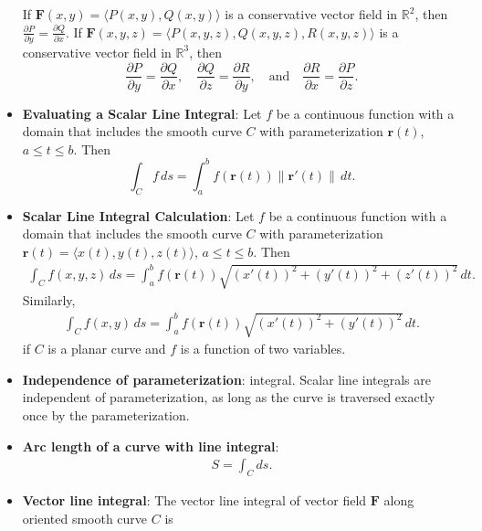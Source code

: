 \documentclass{report}
\begin{document}
\begin{itemize}
            \bigbreak \noindent 
            If $\mathbf{F}(x,y) = \langle P(x,y), Q(x,y) \rangle$ is a conservative vector field in $\mathbb{R}^2$, then $\frac{\partial P}{\partial y} = \frac{\partial Q}{\partial x}$.
            \bigbreak \noindent 
            If $\mathbf{F}(x,y,z) = \langle P(x,y,z), Q(x,y,z), R(x,y,z) \rangle$ is a conservative vector field in $\mathbb{R}^3$, then
            \[
                \frac{\partial P}{\partial y} = \frac{\partial Q}{\partial x}, \quad \frac{\partial Q}{\partial z} = \frac{\partial R}{\partial y}, \quad \text{and} \quad \frac{\partial R}{\partial x} = \frac{\partial P}{\partial z}.
            \]
        \item \textbf{Evaluating a Scalar Line Integral}:
            Let \(f\) be a continuous function with a domain that includes the smooth curve \(C\) with parameterization \(\mathbf{r}(t)\), \(a \leq t \leq b\). Then
            \[
                \int_C f\,ds = \int_a^b f(\mathbf{r}(t)) \|\mathbf{r}'(t)\|\,dt.
            \]
        \item \textbf{Scalar Line Integral Calculation}:
            Let $f$ be a continuous function with a domain that includes the smooth curve $C$ with parameterization $\mathbf{r}(t) = \langle x(t), y(t), z(t) \rangle$, $a \leq t \leq b$. Then
            \begin{align*}
                \int_{C} f(x,y,z)\,ds = \int_{a}^{b} f(\mathbf{r}(t))\sqrt{(x'(t))^2 + (y'(t))^2 + (z'(t))^2}\,dt 
            .\end{align*}
            Similarly,
            \begin{align*}
                \int_{C} f(x,y)\,ds = \int_{a}^{b} f(\mathbf{r}(t))\sqrt{(x'(t))^2 + (y'(t))^2}\,dt
            .\end{align*}
            if $C$ is a planar curve and $f$ is a function of two variables.
        \item \textbf{Independence of parameterization}:
            integral. Scalar line integrals are independent of parameterization, as long as the curve is traversed exactly once by the parameterization.
        \item \textbf{Arc length of a curve with line integral}:
            \begin{align*}
                S = \int_C ds
            .\end{align*}
        \item \textbf{Vector line integral}:
            The vector line integral of vector field $\mathbf{F}$ along oriented smooth curve $C$ is

\end{itemize}
\end{document}
